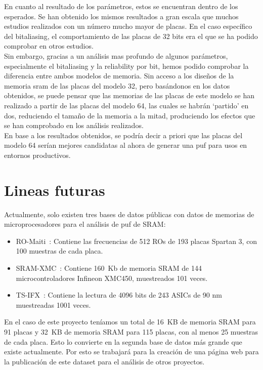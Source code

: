 \documentclass[spanish]{template/minim}
\begin{document}
En cuanto al resultado de los parámetros, estos se encuentran dentro de los esperados. Se han obtenido los mismos resultados a gran escala que muchos estudios realizados con un número mucho mayor de placas. En el caso específico del bitaliasing, el comportamiento de las placas de 32 bits era el que se ha podido comprobar en otros estudios.\\

Sin embargo, gracias a un análisis mas profundo de algunos parámetros, especialmente el bitaliasing y la reliability por bit, hemos podido comprobar la diferencia entre ambos modelos de memoria. Sin acceso a los diseños de la memoria \gls{sram} de las placas del modelo 32, pero basándonos en los datos obtenidos, se puede pensar que las memorias de las placas de este modelo se han realizado a partir de las placas del modelo 64, las cuales se habrán `partido' en dos, reduciendo el tamaño de la memoria a la mitad, produciendo los efectos que se han comprobado en los análisis realizados.\\

En base a los resultados obtenidos, se podría decir a priori que las placas del modelo 64 serían mejores candidatas al ahora de generar una \gls{puf} para usos en entornos productivos.\\

\section{Lineas futuras}\label{sec:lineas_futuras}

Actualmente, solo existen tres bases de datos públicas con datos de memorias de microprocesadores para el análisis de \gls{puf} de SRAM:

\begin{itemize}
\item RO-Maiti~\cite{maiti_large}: Contiene las frecuencias de 512 ROs de 193 placas Spartan 3, con 100 muestras de cada placa.
\item SRAM-XMC~\cite{sram_xmc}: Contiene 160~Kb de memoria SRAM de 144 microcontroladores Infineon XMC450, muestreados 101 veces.
\item TS-IFX~\cite{bucci}: Contiene la lectura de 4096 bits de 243 ASICs de 90 nm muestreadas 1001 veces.
\end{itemize}

En el caso de este proyecto teníamos un total de 16~KB de memoria SRAM para 91 placas y 32~KB de memoria SRAM para 115 placas, con al menos 25 muestras de cada placa. Esto lo convierte en la segunda base de datos más grande que existe actualmente. Por esto se trabajará para la creación de una página web para la publicación de este dataset para el análisis de otros proyectos.\\
\end{document}
